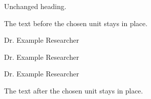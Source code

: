 \documentclass[11pt]{article}
\begin{document}
Unchanged heading.

The text before the chosen unit stays in place.

Dr. Example Researcher

Dr. Example Researcher

\vspace{25mm}
Dr. Example Researcher


\par\vspace{25mm}
The text after the chosen unit stays in place.
\end{document}

